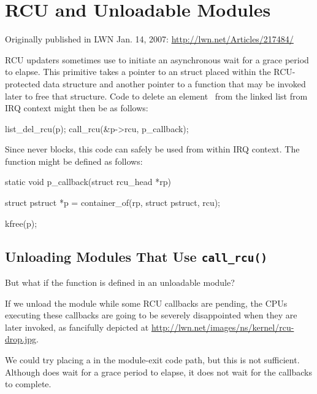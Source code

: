 \section{RCU and Unloadable Modules}
\label{sec:rcu:RCU and Unloadable Modules}

\begin{Note}
 Originally published in LWN Jan. 14, 2007: \url{http://lwn.net/Articles/217484/}
\end{Note}

RCU updaters sometimes use  to initiate an asynchronous wait for
a grace period to elapse.
This primitive takes a pointer to an 
struct placed within the RCU-protected data structure and another pointer
to a function that may be invoked later to free that structure.
Code to
delete an element~ from the linked list from IRQ context might then be
as follows:

\begin{VerbatimU}
	list_del_rcu(p);
	call_rcu(&p->rcu, p_callback);
\end{VerbatimU}

Since  never blocks, this code can safely be used from within
IRQ context.
The function  might be defined as follows:

\begin{VerbatimU}
	static void p_callback(struct rcu_head *rp)
	{
		struct pstruct *p = container_of(rp, struct pstruct, rcu);

		kfree(p);
	}
\end{VerbatimU}


\subsection{Unloading Modules That Use \texttt{call\_rcu()}}
\label{sec:rcu:Unloading Modules That Use call_rcu()}

But what if the  function is defined in an unloadable module?

If we unload the module while some RCU callbacks are pending,
the CPUs executing these callbacks are going to be severely
disappointed when they are later invoked, as fancifully depicted at
\url{http://lwn.net/images/ns/kernel/rcu-drop.jpg}.

We could try placing a  in the module-exit code path,
but this is not sufficient.
Although  does wait for a
grace period to elapse, it does not wait for the callbacks to complete.

